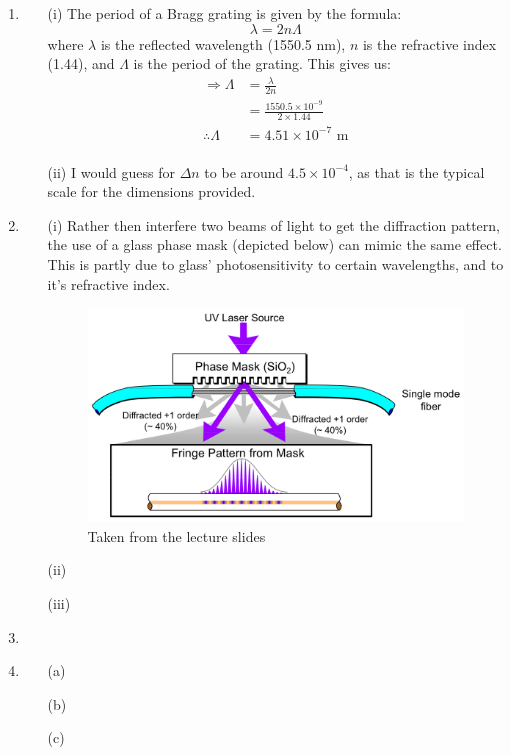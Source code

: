 \documentclass[10pt,a4paper]{article}
\begin{document}
\begin{enumerate}
	\item 
		\begin{itemize}
			\item[(i)] The period of a Bragg grating is given by the formula:
				\begin{equation*}
					\lambda = 2 n \Lambda
				\end{equation*}
				where $\lambda$ is the reflected wavelength (1550.5 nm), $n$ is the refractive index (1.44), and $\Lambda$ is the period of the grating. This gives us:
				\begin{align*}
					\Rightarrow \Lambda &= \frac{\lambda}{2n} \\
					 &= \frac{1550.5 \times 10^{-9}}{2 \times 1.44} \\
					\therefore \Lambda &= 4.51 \times 10^{-7} \mbox{ m} \\
				\end{align*}
			\item[(ii)] I would guess for $\Delta n$ to be around $4.5 \times 10 ^{-4}$, as that is the typical scale for the dimensions provided.
		\end{itemize}
	\item
		\begin{itemize}
			\item[(i)] Rather then interfere two beams of light to get the diffraction pattern, the use of a glass phase mask (depicted below) can mimic the same effect. This is partly due to glass' photosensitivity to certain wavelengths, and to it's refractive index.
				\begin{figure}[!h]
					\begin{center}
						\includegraphics[width=0.7\linewidth]{phaseMask.png}
					\end{center}
					\caption{Taken from the lecture slides}
				\end{figure}
			\item[(ii)]
			\item[(iii)]
		\end{itemize}
	\item
	\item
		\begin{itemize}
			\item[(a)]
			\item[(b)]
			\item[(c)]
		\end{itemize}
\end{enumerate}
\end{document}
